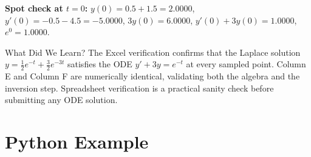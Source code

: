 \documentclass[12pt,a4paper]{article}
\begin{document}
\medskip
\textbf{Spot check at $t=0$:}
$y(0) = 0.5+1.5 = 2.0000$, $y'(0) = -0.5-4.5 = -5.0000$, $3y(0)=6.0000$,
$y'(0)+3y(0) = 1.0000$, $e^0 = 1.0000$. \checkmark

\begin{learnbox}{What Did We Learn?}
The Excel verification confirms that the Laplace solution $y = \tfrac{1}{2}e^{-t}+\tfrac{3}{2}e^{-3t}$
satisfies the ODE $y'+3y=e^{-t}$ at every sampled point. Column E and Column F are
numerically identical, validating both the algebra and the inversion step. Spreadsheet
verification is a practical sanity check before submitting any ODE solution.
\end{learnbox}

\section{Python Example}
\end{document}
